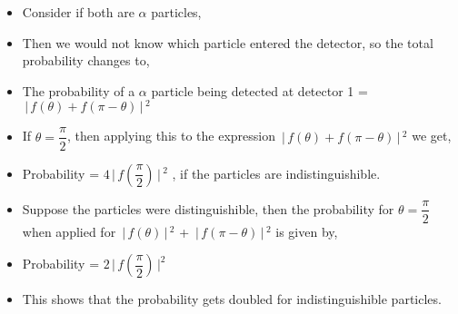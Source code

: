 \documentclass[aspectratio=169]{beamer}
\begin{document}
\begin{frame}{}

	\begin{itemize}

\item Consider if both are $ \alpha $ particles, \newline
\item Then we would not know which particle entered the detector, so the total probability changes to,  \newline
\item  The probability of a $ \alpha $ particle 
		being detected at detector 1 = $ \,\Bigr\rvert\,f(\theta) + f(\pi - \theta) \,\Bigr\rvert\,^{2} $
		
	\end{itemize}
	
\end{frame}

\begin{frame}

	\begin{itemize}

		\item If  $\theta = \dfrac{\pi}{2}$,  then applying this to the expression  $\,\Bigr\rvert\,f(\theta)+f(\pi-\theta)\,\Bigr\rvert\,^{2}$ we get, \newline
		\item Probability = $4 \,\Bigr\rvert\,f\left(\dfrac{\pi}{2}\right) \,\Bigr\rvert\,^{2}$ , if the particles are indistinguishible.
		
	\end{itemize}
	
\end{frame}

\begin{frame}{}

	\begin{itemize}

		\item Suppose the particles were distinguishible, then the probability for $\theta = \dfrac{\pi}{2}$ when applied for $ \,\Bigr\rvert\,f(\theta) \,\Bigr\rvert\,^{2} $ + $ \,\Bigr\rvert\,f(\pi - \theta) \,\Bigr\rvert\,^{2} $ is given by, \newline
		\item Probability = $2 \,\Bigr\rvert\, f\left(\dfrac{\pi}{2}\right) \,\Bigr\rvert ^{2}$ \newline 
		\item This shows that the probability gets doubled for indistinguishible particles.

	\end{itemize}
	
\end{frame}
\end{document}

